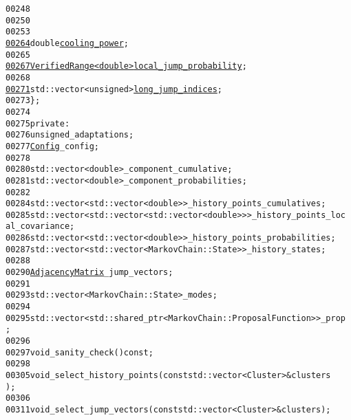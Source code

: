 \begin{footnotesize}
\begin{alltt}
00248 
00250 
00253 
\hypertarget{proposal__functions_8hh_source_l00264}{}\hyperlink{structeos_1_1proposal__functions_1_1GlobalLocal_1_1Config_afc5df7dfbda07b6296b48bb3147f91ab}{00264}                         \textcolor{keywordtype}{double} \hyperlink{structeos_1_1proposal__functions_1_1GlobalLocal_1_1Config_afc5df7dfbda07b6296b48bb3147f91ab}{cooling_power};
00265 
\hypertarget{proposal__functions_8hh_source_l00267}{}\hyperlink{structeos_1_1proposal__functions_1_1GlobalLocal_1_1Config_ad078b40f919f62b9311f433b1152bbb6}{00267}                         \hyperlink{classeos_1_1VerifiedRange}{VerifiedRange<double>} \hyperlink{structeos_1_1proposal__functions_1_1GlobalLocal_1_1Config_ad078b40f919f62b9311f433b1152bbb6}{local_jump_probability};
00268 
\hypertarget{proposal__functions_8hh_source_l00271}{}\hyperlink{structeos_1_1proposal__functions_1_1GlobalLocal_1_1Config_a81dad6982f265eccfc5f1d030f0ff5a7}{00271}                         std::vector<unsigned> \hyperlink{structeos_1_1proposal__functions_1_1GlobalLocal_1_1Config_a81dad6982f265eccfc5f1d030f0ff5a7}{long_jump_indices};
00273                 \};
00274 
00275             \textcolor{keyword}{private}:
00276                 \textcolor{keywordtype}{unsigned} \_adaptations;
00277                 \hyperlink{structeos_1_1proposal__functions_1_1GlobalLocal_1_1Config}{Config} \_config;
00278 
00280                 std::vector<double> \_component\_cumulative;
00281                 std::vector<double> \_component\_probabilities;
00282 
00284                 std::vector<std::vector<double>> \_history\_points\_cumulatives;
00285                 std::vector<std::vector<std::vector<double>>> \_history\_points\_loc
      al\_covariance;
00286                 std::vector<std::vector<double>> \_history\_points\_probabilities;
00287                 std::vector<std::vector<MarkovChain::State>> \_history\_states;
00288 
00290                 \hyperlink{classeos_1_1proposal__functions_1_1AdjacencyMatrix}{AdjacencyMatrix} \_jump\_vectors;
00291 
00293                 std::vector<MarkovChain::State> \_modes;
00294 
00295                 std::vector<std::shared\_ptr<MarkovChain::ProposalFunction>> \_prop
      ;
00296 
00297                 \textcolor{keywordtype}{void} \_sanity\_check() \textcolor{keyword}{const};
00298 
00305                 \textcolor{keywordtype}{void} \_select\_history\_points(\textcolor{keyword}{const} std::vector<Cluster> & clusters
      );
00306 
00311                 \textcolor{keywordtype}{void} \_select\_jump\_vectors(\textcolor{keyword}{const} std::vector<Cluster> & clusters);
      

\end{alltt}
\end{footnotesize}
